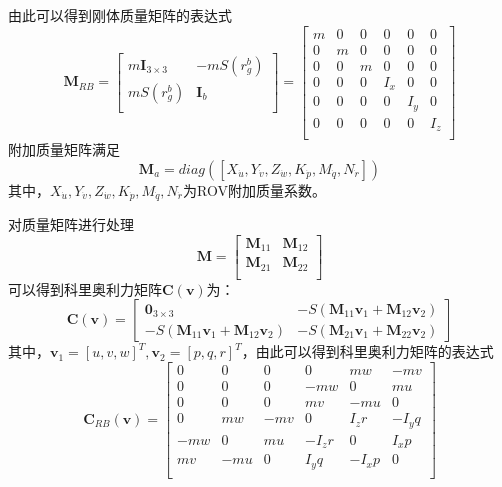 由此可以得到刚体质量矩阵的表达式
\begin{equation}
    \symbf{M}_{RB} = \begin{bmatrix}
        m\symbf{I}_{3\times 3} & -mS(r_g^b) \\
        mS(r_g^b) & \symbf{I}_b \\
    \end{bmatrix} = \begin{bmatrix}
    m & 0 & 0 & 0 & 0 & 0 \\
    0 & m & 0 & 0 & 0 & 0 \\
    0 & 0 & m & 0 & 0 & 0 \\
    0 & 0 & 0 & I_x & 0 & 0 \\
    0 & 0 & 0 & 0 & I_y & 0 \\
    0 & 0 & 0 & 0 & 0 & I_z \\
\end{bmatrix}
\end{equation}
附加质量矩阵满足
\begin{equation}
    \symbf{M}_a = diag([X_{\dot{u}},Y_{\dot{v}},Z_{\dot{w}},K_{\dot{p}},M_{\dot{q}},N_{\dot{r}}])
\end{equation}
其中，$X_{\dot{u}},Y_{\dot{v}},Z_{\dot{w}},K_{\dot{p}},M_{\dot{q}},N_{\dot{r}}$为ROV附加质量系数。

对质量矩阵进行处理
\begin{equation}
\symbf{M} = \begin{bmatrix}
    \symbf{M}_{11} & \symbf{M}_{12} \\
    \symbf{M}_{21} & \symbf{M}_{22} \\
\end{bmatrix}    
\end{equation}
可以得到科里奥利力矩阵$\symbf{C}(\symbf{v})$为：
\begin{equation}
    \symbf{C}(\symbf{v}) = \begin{bmatrix}
        \symbf{0}_{3\times 3} & -S(\symbf{M}_{11}\symbf{v}_1+\symbf{M}_{12}\symbf{v}_2) \\ 
        -S(\symbf{M}_{11}\symbf{v}_1+\symbf{M}_{12}\symbf{v}_2) & -S(\symbf{M}_{21}\symbf{v}_1+\symbf{M}_{22}\symbf{v}_2)
    \end{bmatrix}
\end{equation}
其中，$\symbf{v}_1 = [u,v,w]^T,\symbf{v}_2=[p,q,r]^T$，由此可以得到科里奥利力矩阵的表达式
\begin{equation}
    \symbf{C}_{RB}(\symbf{v})=
\begin{bmatrix}
    0 & 0 & 0 & 0 & mw & -mv \\
    0 & 0 & 0 & -mw & 0 & mu \\
    0 & 0 & 0 & mv & -mu & 0 \\
    0 & mw & -mv & 0 & I_zr & -I_yq \\
    -mw & 0 & mu & -I_zr & 0 & I_xp \\
    mv & -mu & 0 & I_yq & -I_xp & 0 \\
\end{bmatrix}
\end{equation}

